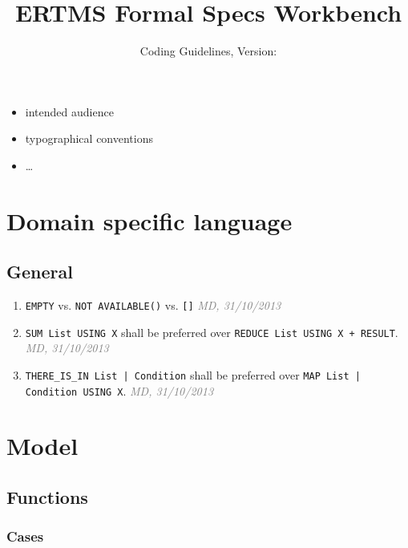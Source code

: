 \documentclass[draft, a4paper, oneside]{scrreprt}
\newcommand{\docTitle}{ERTMS Formal Specs Workbench}
\newcommand{\docSubTitle}{Coding Guidelines}
\let\emph\textsl
\newcommand{\code}[1]{\lstinline$#1$}
\newcommand{\ruleauthor}[2]{\mbox{}\newline\mbox{}\hfill{\footnotesize\textcolor{gray}{\emph{#1, #2}}}\xspace}
\begin{document}
\title{\docTitle}
\subtitle{\docSubTitle, Version: \vhCurrentVersion}
\date{\vhCurrentDate}
\author{\vhListAllAuthorsLongWithAbbrev}
\maketitle


\begin{versionhistory}

\end{versionhistory}

\newpage
\tableofcontents
\newpage

\begin{itemize}
\item intended audience
\item typographical conventions
\item \ldots
\end{itemize}

\chapter{Domain specific language}

\section{General}
\begin{enumerate}
\item {} \code{EMPTY} vs. \code{NOT AVAILABLE()} vs. \code{[]} \ruleauthor{MD}{31/10/2013}
\item \code{SUM List USING X} shall be preferred over \code{REDUCE List USING X + RESULT}. \ruleauthor{MD}{31/10/2013}
\item \code{THERE_IS_IN List | Condition} shall be preferred over \code{MAP List | Condition USING X}. \ruleauthor{MD}{31/10/2013}
\end{enumerate}


\chapter{Model}

\section{Functions}
\subsection{Cases}
\end{document}
